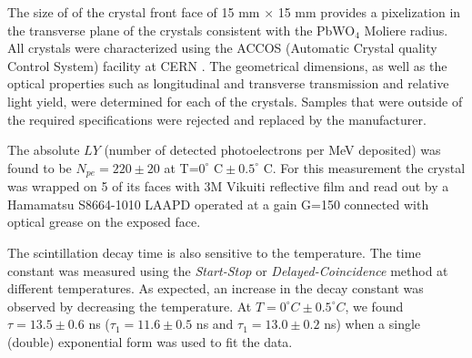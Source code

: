 The size of of the crystal front face of 15 mm $\times$ 15 mm  provides a pixelization in the transverse plane of the crystals consistent with the  PbWO$_4$  Moliere radius.  All crystals were characterized using the ACCOS (Automatic Crystal quality Control System) facility  at CERN \cite{accos}. The geometrical dimensions, as well as the optical properties such as longitudinal and transverse  transmission and relative light yield, were determined for each of the crystals. Samples that were outside of the required specifications were rejected and replaced by the manufacturer. 

The absolute $LY$ (number of detected photoelectrons per MeV deposited) was found to be $N_{pe}=220\pm 20$ at T=$0^\circ\textrm{ C}\pm 0.5^\circ\textrm{ C}$. For this measurement  the crystal was wrapped on 5 of its faces with 3M Vikuiti reflective film and read out by a Hamamatsu S8664-1010 LAAPD operated at a gain G=150 connected with optical grease on the exposed face. 

The scintillation decay time is also sensitive to the temperature. The time constant was measured using the {\it Start-Stop} or {\it Delayed-Coincidence} method at different temperatures. As expected, an increase in the decay constant was observed by decreasing the temperature. At $T=0^\circ C\pm 0.5^\circ C$, we found $\tau=13.5\pm 0.6$ ns ($\tau_1=11.6\pm 0.5$ ns and $\tau_1=13.0\pm 0.2$ ns) when a single (double) exponential form was used to fit the data.



